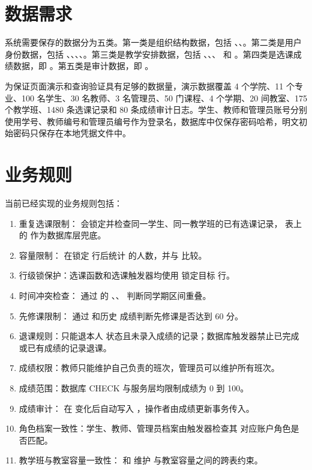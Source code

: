 \section{数据需求}

系统需要保存的数据分为五类。第一类是组织结构数据，包括 、、。第二类是用户身份数据，包括 、、、、。第三类是教学安排数据，包括 、、、 和 。第四类是选课成绩数据，即 。第五类是审计数据，即 。

为保证页面演示和查询验证具有足够的数据量，演示数据覆盖 4 个学院、11 个专业、100 名学生、30 名教师、3 名管理员、50 门课程、4 个学期、20 间教室、175 个教学班、1480 条选课记录和 80 条成绩审计日志。学生、教师和管理员账号分别使用学号、教师编号和管理员编号作为登录名，数据库中仅保存密码哈希，明文初始密码只保存在本地凭据文件中。

\section{业务规则}

当前已经实现的业务规则包括：

\begin{enumerate}
  \item 重复选课限制： 会锁定并检查同一学生、同一教学班的已有选课记录， 表上的  作为数据库层兜底。
  \item 容量限制： 在锁定  行后统计  的人数，并与  比较。
  \item 行级锁保护：选课函数和选课触发器均使用  锁定目标  行。
  \item 时间冲突检查： 通过  的 、、 判断同学期区间重叠。
  \item 先修课限制： 通过  和历史  成绩判断先修课是否达到 60 分。
  \item 退课规则：只能退本人  状态且未录入成绩的记录；数据库触发器禁止已完成或已有成绩的记录退课。
  \item 成绩权限：教师只能维护自己负责的班次，管理员可以维护所有班次。
  \item 成绩范围：数据库 CHECK 与服务层均限制成绩为 0 到 100。
  \item 成绩审计： 在  变化后自动写入 ，操作者由成绩更新事务传入。
  \item 角色档案一致性：学生、教师、管理员档案由触发器检查其  对应账户角色是否匹配。
  \item 教学班与教室容量一致性： 和  维护  与教室容量之间的跨表约束。
\end{enumerate}

